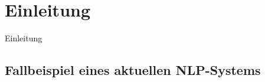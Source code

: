 \chapter{Einleitung}\label{ch:intro}

Einleitung


\section{Fallbeispiel eines aktuellen NLP-Systems}